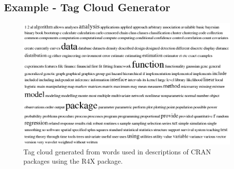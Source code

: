 \documentclass[a4paper,10pt]{article}
\begin{document}
\subsection*{Example - Tag Cloud Generator}

\begin{figure}[h]
 \centering
 \includegraphics[width=.9\textwidth]{pictures/tags.png}
 \caption{Tag cloud generated from words used in descriptions of CRAN packages using the R4X package. }
\end{figure}
\end{document}
